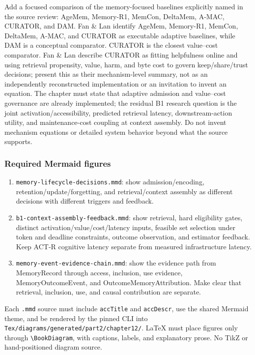 Add a focused comparison of the memory-focused baselines explicitly named in the source review: AgeMem, Memory-R1, MemCon, DeltaMem, A-MAC, CURATOR, and DAM. Fan \& Lan identify AgeMem, Memory-R1, MemCon, DeltaMem, A-MAC, and CURATOR as executable adaptive baselines, while DAM is a conceptual comparator. CURATOR is the closest value--cost comparator. Fan \& Lan describe CURATOR as fitting helpfulness online and using retrieval propensity, value, harm, and byte cost to govern keep/share/trust decisions; present this as their mechanism-level summary, not as an independently reconstructed implementation or an invitation to invent an equation. The chapter must state that adaptive admission and value--cost governance are already implemented; the residual B1 research question is the joint activation/accessibility, predicted retrieval latency, downstream-action utility, and maintenance-cost coupling at context assembly. Do not invent mechanism equations or detailed system behavior beyond what the source supports.

\subsubsection{Required Mermaid figures}\label{required-mermaid-figures}

\begin{enumerate}
\def\labelenumi{\arabic{enumi}.}
\tightlist
\item
  \texttt{memory-lifecycle-decisions.mmd}: show admission/encoding, retention/update/forgetting, and retrieval/context assembly as different decisions with different triggers and feedback.
\item
  \texttt{b1-context-assembly-feedback.mmd}: show retrieval, hard eligibility gates, distinct activation/value/cost/latency inputs, feasible set selection under token and deadline constraints, outcome observation, and estimator feedback. Keep ACT-R cognitive latency separate from measured infrastructure latency.
\item
  \texttt{memory-event-evidence-chain.mmd}: show the evidence path from MemoryRecord through access, inclusion, use evidence, MemoryOutcomeEvent, and OutcomeMemoryAttribution. Make clear that retrieval, inclusion, use, and causal contribution are separate.
\end{enumerate}

Each \texttt{.mmd} source must include \texttt{accTitle} and \texttt{accDescr}, use the shared Mermaid theme, and be rendered by the pinned CLI into \texttt{Tex/diagrams/generated/part2/chapter12/}. LaTeX must place figures only through \texttt{\textbackslash{}BookDiagram}, with captions, labels, and explanatory prose. No TikZ or hand-positioned diagram source.

